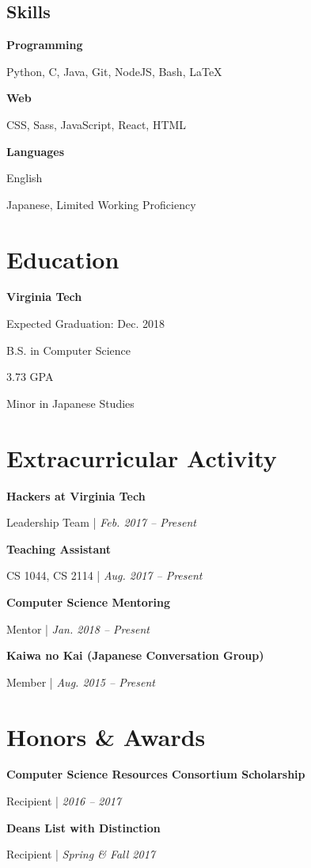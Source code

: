 \documentclass[9pt]{extarticle}
\newcommand{\Subsection}[2]{
    {\normalsize\bfseries\color{subsection}#1}
    \begin{trivlist}
        \color{bullet}
        #2
    \end{trivlist}
}
\newcommand{\ChronoItem}[2]{
    \item {\color{bullet}#1 | {\footnotesize\textit{#2}}}
}
\begin{document}
\begin{paracol}{2}
\begin{leftcolumn}
        \section{Skills}
            \Subsection{Programming}{
                \item Python, C, Java, Git, NodeJS, Bash, LaTeX
            }
            \vfill
            \Subsection{Web}{
                \item CSS, Sass, JavaScript, React, HTML
            }
            \vfill
            \Subsection{Languages}{
                \item English
                \item Japanese, Limited Working Proficiency
            }
        \pagebreak
    \end{leftcolumn}
    \begin{rightcolumn}
        \section{Education}
            \Subsection{Virginia Tech}{
                \item Expected Graduation: Dec. 2018
                \item B.S. in Computer Science
                \item 3.73 GPA
                \item Minor in Japanese Studies
            }
        \vfill
        \section{Extracurricular Activity}
            \Subsection{Hackers at Virginia Tech}{
                \ChronoItem{Leadership Team}{Feb. 2017 -- Present}
            }
            \vfill
            \Subsection{Teaching Assistant}{
                \ChronoItem{CS 1044, CS 2114}{Aug. 2017 -- Present}
            }
            \vfill
            \Subsection{Computer Science Mentoring}{
                \ChronoItem{Mentor}{Jan. 2018 -- Present}
            }
            \vfill
            \Subsection{Kaiwa no Kai (Japanese Conversation Group)}{
                \ChronoItem{Member}{Aug. 2015 -- Present}
            }
        \vfill
        \section{Honors \& Awards}
            \Subsection{Computer Science Resources Consortium Scholarship}{
                \ChronoItem{Recipient}{2016 -- 2017}
            }
            \vfill
            \Subsection{Deans List with Distinction}{
                \ChronoItem{Recipient}{Spring \& Fall 2017}
            }
        \pagebreak
    \end{rightcolumn}
\end{paracol}
\end{document}
